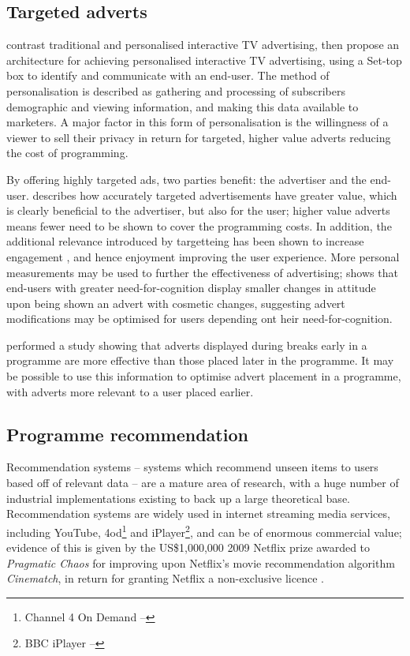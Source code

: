 \subsection{Targeted adverts}

	\citet{personalised_interactive_tv_advertising} contrast traditional and personalised interactive TV advertising, then propose an architecture for achieving personalised interactive TV advertising, using a Set-top box to identify and communicate with an end-user. The method of personalisation is described as gathering and processing of subscribers demographic and viewing information, and making this data available to marketers. A major factor in this form of personalisation is the willingness of a viewer to sell their privacy in return for targeted, higher value adverts reducing the cost of programming.

	By offering highly targeted ads, two parties benefit: the advertiser and the end-user. \citet{advert_value} describes how accurately targeted advertisements have greater value, which is clearly beneficial to the advertiser, but also for the user; higher value adverts means fewer need to be shown to cover the programming costs. In addition, the additional relevance introduced by targetteing has been shown to increase engagement \citep{advertising_engagement}, and hence enjoyment \citep{yahoo-intrusive-advertising} improving the user experience. More personal measurements may be used to further the effectiveness of advertising; \citet{nettelhorst2012effects} shows that end-users with greater need-for-cognition display smaller changes in attitude upon being shown an advert with cosmetic changes, suggesting advert modifications may be optimised for users depending ont heir need-for-cognition.

	\citet{jeong2011position} performed a study showing that adverts displayed during breaks early in a programme are more effective than those placed later in the programme. It may be possible to use this information to optimise advert placement in a programme, with adverts more relevant to a user placed earlier.

\subsection{Programme recommendation}

	Recommendation systems -- systems which recommend unseen items to users based off of relevant data -- are a mature area of research, with a huge number of industrial implementations existing to back up a large theoretical base. Recommendation systems are widely used in internet streaming media services, including YouTube, 4od\footnote{Channel 4 On Demand -- } and iPlayer\footnote{BBC iPlayer -- }, and can be of enormous commercial value; evidence of this is given by the US\$1,000,000 2009 Netflix prize awarded to \textit{Pragmatic Chaos} for improving upon Netflix's movie recommendation algorithm \textit{Cinematch}, in return for granting Netflix a non-exclusive licence \citep{pragmatic_chaos}.

